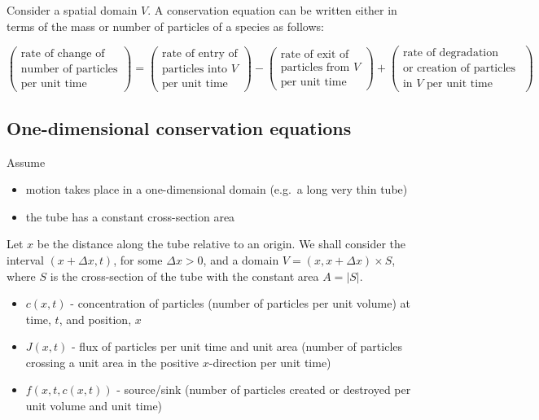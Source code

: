 \documentclass[
  letterpaper,
  DIV=11,
  numbers=noendperiod]{scrreprt}
\providecommand{\tightlist}{%
  \setlength{\itemsep}{0pt}\setlength{\parskip}{0pt}}\usepackage{longtable,booktabs,array}
\theoremstyle{plain}
\theoremstyle{definition}
\theoremstyle{plain}
\theoremstyle{remark}
\begin{document}
Consider a spatial domain \(V\). A conservation equation can be written
either in terms of the mass or number of particles of a species as
follows:

\[
\begin{pmatrix}
\text{rate of change of}\\
\text{number of particles} \\
\text{per unit time } 
\end{pmatrix}
= \begin{pmatrix}
\text{rate of entry of}\\
\text{particles into $V$}\\
\text{per unit time}
\end{pmatrix}
- \begin{pmatrix}
\text{rate of exit of }\\
\text{particles from $V$}\\
\text{per unit time}
\end{pmatrix}
+ 
 \begin{pmatrix}
 \text{rate of degradation}\\
 \text{or creation of particles }\\
  \text{in $V$ per unit time} 
\end{pmatrix}
\]

\hypertarget{one-dimensional-conservation-equations}{%
\subsection{One-dimensional conservation
equations}\label{one-dimensional-conservation-equations}}

Assume

\begin{itemize}
\tightlist
\item
  motion takes place in a one-dimensional domain (e.g.~a long very thin
  tube)
\item
  the tube has a constant cross-section area
\end{itemize}

Let \(x\) be the distance along the tube relative to an origin. We shall
consider the interval \((x+\Delta x, t)\), for some \(\Delta x >0\), and
a domain \(V= (x, x+ \Delta x) \times S\), where \(S\) is the
cross-section of the tube with the constant area \(A=|S|\).

\begin{itemize}
\item
  \(c(x,t)\) - concentration of particles (number of particles per unit
  volume) at time, \(t\), and position, \(x\)
\item
  \(J(x,t)\) - flux of particles per unit time and unit area (number of
  particles crossing a unit area in the positive \(x\)-direction per
  unit time)
\item
  \(f(x,t ,c(x,t))\) - source/sink (number of particles created or
  destroyed per unit volume and unit time)
\end{itemize}
\end{document}
